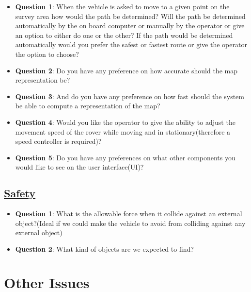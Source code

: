 \documentclass[11pt, a4paper]{article}
\begin{document}
\begin{itemize}

\item[] \textbf{Question 1}: When the vehicle is asked to move to a given point on the survey area how would the path be determined? Will the path be determined automatically by the on board computer or manually by the operator or give an option to either do one or the other? If the path would be determined automatically would you prefer the safest or fastest route or give the operator the option to choose?

\item[] \textbf{Question 2}: Do you have any preference on how accurate should the map representation be? 

\item[] \textbf{Question 3}: And do you have any preference on how fast should the system be able to compute a representation of the map?

\item[] \textbf{Question 4}: Would you like the operator to give the ability to adjust the movement speed of the rover while moving and in stationary(therefore a speed controller is required)?

\item[] \textbf{Question 5}: Do you have any preferences on what other components you would like to see on the user interface(UI)?

\end{itemize}

\subsection{\underline{Safety}}

\begin{itemize}

\item[] \textbf{Question 1}: What is the allowable force when it collide against an external object?(Ideal if we could make the vehicle to avoid from colliding against any external object)

\item[] \textbf{Question 2}: What kind of objects are we expected to find?

\end{itemize}

\section{Other Issues}
\end{document}
